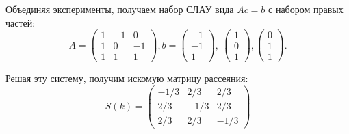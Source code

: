 \documentclass[a4 paper, 12 pt]{extarticle}
\begin{document}
  Объединяя эксперименты, получаем набор СЛАУ вида $Ac=b$ с набором правых частей:
   \[ A = \left(\begin{smallmatrix}
   1 & -1 & 0 \\
   1 & 0 & -1 \\
   1 & 1 & 1
   \end{smallmatrix}\right), b = \left(\begin{smallmatrix}
   -1 \\
   -1 \\
   1
   \end{smallmatrix}\right), \ 
   \left(\begin{smallmatrix}
   1 \\
   0 \\
   1
   \end{smallmatrix}\right),
   \left(\begin{smallmatrix}
   0 \\
   1 \\
   1
   \end{smallmatrix}\right).\]
   
   Решая эту систему, получим искомую матрицу рассеяния:
   \begin{equation}
   \label{starData}
   S(k)=
   \begin{pmatrix}
   -1/3 & 2/3 & 2/3 \\
   2/3 & -1/3 & 2/3 \\
   2/3 & 2/3 & -1/3 
   \end{pmatrix}
   \end{equation}
\end{document}
